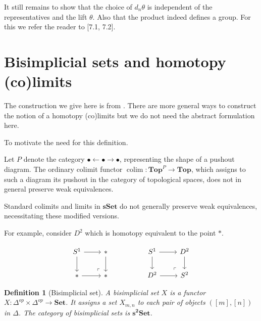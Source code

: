 \documentclass[12pt]{report}
\numberwithin{equation}{section}
\DeclareMathOperator*{\colim}{co{\lim}}
\newtheorem{definition}[dummy]{Definition}
\begin{document}
	It still remains to show that the choice of \( d_n\theta \) is independent of the representatives and the lift \( \theta \). Also that the product indeed defines a group. For this we refer the reader to \cite{Goerss_Jardine_2009}[7.1, 7.2].
	
	
	
	\section{Bisimplicial sets and homotopy (co)limits}
	The construction we give here is from \cite{Goerss_Jardine_2009}. There are more general ways to construct the notion of a homotopy (co)limits but we do not need the abstract formulation here.
	
	To motivate the need for this definition.
	
	Let $P$ denote the category $\bullet \leftarrow \bullet \rightarrow \bullet$, representing the shape of a pushout diagram. The ordinary colimit functor $\colim \colon \mathbf{Top}^P \to \mathbf{Top}$, which assigns to such a diagram its pushout in the category of topological spaces, does not in general preserve weak equivalences.
	
	Standard colimits and limits in $\mathbf{sSet}$ do not generally preserve weak equivalences, necessitating these modified versions.
	
	For example, consider \( D^2 \) which is homotopy equivalent to the point \( * \).
	
	\[\begin{tikzcd}
		{S^1} & {*} && {S^1} & {D^2} \\
		{*} & {*} && {D^2} & {S^2}
		\arrow[from=1-1, to=1-2]
		\arrow[from=1-1, to=2-1]
		\arrow[from=1-2, to=2-2]
		\arrow[from=1-4, to=1-5]
		\arrow[from=1-4, to=2-4]
		\arrow[from=1-5, to=2-5]
		\arrow[from=2-1, to=2-2]
		\arrow["\lrcorner"{anchor=center, pos=0.125, rotate=180}, draw=none, from=2-2, to=1-1]
		\arrow[from=2-4, to=2-5]
		\arrow["\lrcorner"{anchor=center, pos=0.125, rotate=180}, draw=none, from=2-5, to=1-4]
	\end{tikzcd}\]
	
	
	
	\begin{definition}[Bisimplicial set]
		A bisimplicial set $X$ is a functor $X: \Delta^{op} \times \Delta^{op} \to \mathbf{Set}$. It assigns a set $X_{m,n}$ to each pair of objects $([m], [n])$ in $\Delta$. The category of bisimplicial sets is $\mathbf{s^2Set}$.
	\end{definition}
	
\end{document}
